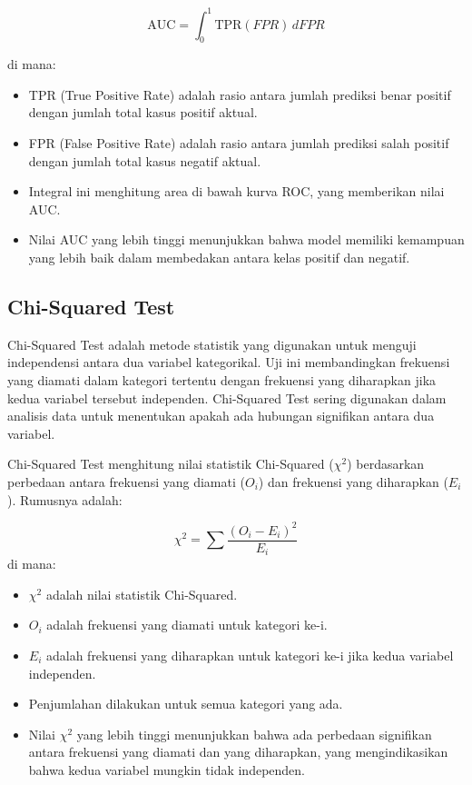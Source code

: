 \begin{equation}
    \text{AUC} = \int_0^1 \text{TPR}(FPR) \, dFPR
\end{equation}

di mana:
\begin{itemize}
    \item TPR (True Positive Rate) adalah rasio antara jumlah prediksi benar positif dengan jumlah total kasus positif aktual.
    \item FPR (False Positive Rate) adalah rasio antara jumlah prediksi salah positif dengan jumlah total kasus negatif aktual.
    \item Integral ini menghitung area di bawah kurva ROC, yang memberikan nilai AUC.
    \item Nilai AUC yang lebih tinggi menunjukkan bahwa model memiliki kemampuan yang lebih baik dalam membedakan antara kelas positif dan negatif.
\end{itemize}

\subsection{Chi-Squared Test}
Chi-Squared Test adalah metode statistik yang digunakan untuk menguji independensi antara dua variabel kategorikal. Uji ini membandingkan frekuensi yang diamati dalam kategori tertentu dengan frekuensi yang diharapkan jika kedua variabel tersebut independen. Chi-Squared Test sering digunakan dalam analisis data untuk menentukan apakah ada hubungan signifikan antara dua variabel.

\newpage
Chi-Squared Test menghitung nilai statistik Chi-Squared (\( \chi^2 \)) berdasarkan perbedaan antara frekuensi yang diamati (\( O_i \)) dan frekuensi yang diharapkan (\( E_i \)). Rumusnya adalah:

\begin{equation}
    \chi^2 = \sum \frac{(O_i - E_i)^2}{E_i}
\end{equation}
di mana:
\begin{itemize}
    \item \( \chi^2 \) adalah nilai statistik Chi-Squared.
    \item \( O_i \) adalah frekuensi yang diamati untuk kategori ke-i.
    \item \( E_i \) adalah frekuensi yang diharapkan untuk kategori ke-i jika kedua variabel independen.
    \item Penjumlahan dilakukan untuk semua kategori yang ada.
    \item Nilai \( \chi^2 \) yang lebih tinggi menunjukkan bahwa ada perbedaan signifikan antara frekuensi yang diamati dan yang diharapkan, yang mengindikasikan bahwa kedua variabel mungkin tidak independen.
\end{itemize}

